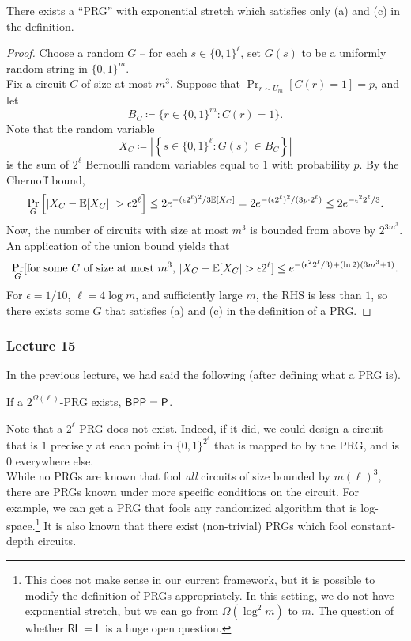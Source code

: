 		\begin{ftheo}
			There exists a ``PRG'' with exponential stretch which satisfies only (a) and (c) in the definition.
		\end{ftheo}
		\begin{proof}
			Choose a random $G$ -- for each $s \in \{0,1\}^\ell$, set $G(s)$ to be a uniformly random string in $\{0,1\}^{m}$.\\
			Fix a circuit $C$ of size at most $m^3$. Suppose that $\Pr_{r \sim U_m}[C(r) = 1] = p$, and let
			\[ B_C \coloneqq \{ r \in \{0,1\}^m : C(r) = 1 \}. \]
			Note that the random variable
			\[ X_C \coloneqq \left| \left\{ s \in \{0,1\}^\ell : G(s) \in B_C \right\} \right| \]
			is the sum of $2^{\ell}$ Bernoulli random variables equal to $1$ with probability $p$. By the Chernoff bound,
			\[ \Pr_G\left[ |X_C - \mathbb{E}[X_C]| > \epsilon 2^\ell \right] \le 2e^{-(\epsilon 2^\ell)^2/3\mathbb{E}[X_C]} = 2e^{-(\epsilon 2^\ell)^2 /(3p \cdot 2^{\ell})} \le 2e^{-\epsilon^2 2^{\ell} / 3}. \]
			Now, the number of circuits with size at most $m^3$ is bounded from above by $2^{3m^3}$. An application of the union bound yields that
			\[ \Pr_G[ \text{for some $C$ of size at most $m^3$, } |X_C - \mathbb{E}[X_C| > \epsilon 2^\ell ] \le e^{-(\epsilon^2 2^\ell/3) + (\ln 2)(3m^3 + 1)}. \]
			For $\epsilon = 1/10$, $\ell = 4\log m$, and sufficiently large $m$, the RHS is less than $1$, so there exists some $G$ that satisfies (a) and (c) in the definition of a PRG.
		\end{proof}

	\subsubsection{Lecture 15}

		In the previous lecture, we had said the following (after defining what a PRG is).

		\begin{ftheo}
			If a $2^{\Omega(\ell)}$-PRG exists, $\mathsf{BPP} = \mathsf{P}$.
		\end{ftheo}
		
		Note that a $2^\ell$-PRG does not exist. Indeed, if it did, we could design a circuit that is $1$ precisely at each point in $\{0,1\}^{2^\ell}$ that is mapped to by the PRG, and is $0$ everywhere else.\\
		While no PRGs are known that fool \emph{all} circuits of size bounded by $m(\ell)^3$, there are PRGs known under more specific conditions on the circuit. For example, we can get a PRG that fools any randomized algorithm that is log-space.\footnote{This does not make sense in our current framework, but it is possible to modify the definition of PRGs appropriately. In this setting, we do not have exponential stretch, but we can go from $\Omega(\log^2 m)$ to $m$. The question of whether $\mathsf{RL} = \mathsf{L}$ is a huge open question.} It is also known that there exist (non-trivial) PRGs which fool constant-depth circuits. \\ %

